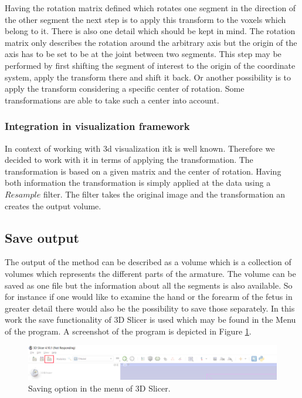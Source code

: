 Having the rotation matrix defined which rotates one segment in the direction of the other segment the next step is to apply this transform to the voxels which belong to it. There is also one detail which should be kept in mind. The rotation matrix only describes the rotation around the arbitrary axis but the origin of the axis has to be set to be at the joint between two segments. This step may be performed by first shifting the segment of interest to the origin of the coordinate system, apply the transform there and shift it back. Or another possibility is to apply the transform considering a specific center of rotation. Some transformations are able to take such a center into account.

\newpage
\subsubsection{Integration in visualization framework}
In context of working with \gls{3d} visualization \gls{itk} is well known. Therefore we decided to work with it in terms of applying the transformation. The transformation is based on a given matrix and the center of rotation. Having both information the transformation is simply applied at the data using a $Resample$ filter. The filter takes the original image and the transformation an creates the output volume.\newline

\subsection{Save output}
The output of the method can be described as a volume which is a collection of volumes which represents the different parts of the armature. The volume can be saved as one file but the information about all the segments is also available. So for instance if one would like to examine the hand or the forearm of the fetus in greater detail there would also be the possibility to save those separately. In this work the save functionality of 3D Slicer is used which may be found in the Menu of the program. A screenshot of the program is depicted in Figure \ref{fig:saving}.


\begin{figure} [!htb]
    \centering
	\includegraphics[width=12cm]{content/images/saving.png}
	\caption{Saving option in the menu of 3D Slicer.} 
	\label{fig:saving}
\end{figure}

